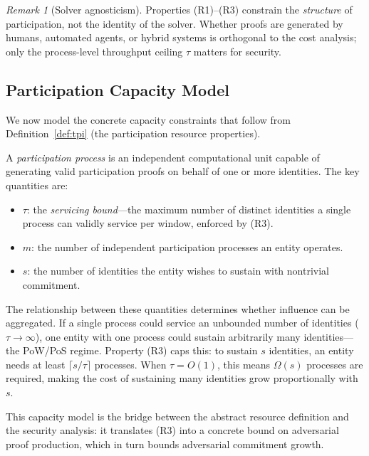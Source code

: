 \documentclass[10pt,journal,twoside]{IEEEtran}
\theoremstyle{remark}
\newtheorem{remark}{Remark}[section]
\begin{document}
	\begin{remark}[Solver agnosticism]
		\label{rem:solver-agnostic}
		Properties (R1)--(R3) constrain the \emph{structure}
		of participation, not the identity of the solver.
		Whether proofs are generated by humans, automated
		agents, or hybrid systems is orthogonal to the cost
		analysis; only the process-level throughput ceiling
		$\tau$ matters for security.
	\end{remark}
	
	\subsection{Participation Capacity Model}
	\label{ssec:capacity-model}
	
	We now model the concrete capacity constraints that
	follow from Definition~\ref{def:tpi} (the participation
	resource properties).
	
	A \emph{participation process} is an independent
	computational unit capable of generating valid
	participation proofs on behalf of one or more identities.
	The key quantities are:
	\begin{itemize}
		\item $\tau$: the \emph{servicing bound}---the maximum
		number of distinct identities a single process can
		validly service per window, enforced by (R3).
		\item $m$: the number of independent participation
		processes an entity operates.
		\item $s$: the number of identities the entity wishes
		to sustain with nontrivial commitment.
	\end{itemize}
	
	The relationship between these quantities determines
	whether influence can be aggregated.
	If a single process could service an unbounded number of
	identities ($\tau \to \infty$), one entity with one
	process could sustain arbitrarily many identities---the
	PoW/PoS regime.
	Property (R3) caps this: to sustain $s$ identities, an
	entity needs at least $\lceil s/\tau \rceil$ processes.
	When $\tau = O(1)$, this means $\Omega(s)$ processes
	are required, making the cost of sustaining many
	identities grow proportionally with $s$.
	
	This capacity model is the bridge between the abstract
	resource definition and the security analysis: it
	translates (R3) into a concrete bound on adversarial
	proof production, which in turn bounds adversarial
	commitment growth.
	
\end{document}

